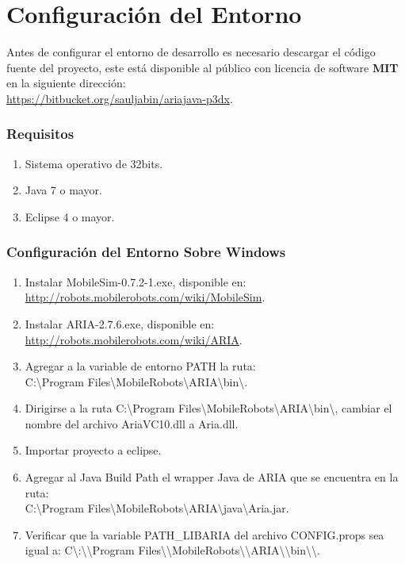 \documentclass[11pt,twoside,A5]{article}
\newcommand{\sourcecode}[2][\footnotesize]{{\ttfamily#1#2}}
\newcommand{\link}[1]{{\footnotesize\url{#1}}}
\begin{document}
\section*{Configuración del Entorno}

Antes de configurar el entorno de desarrollo es necesario descargar el código fuente del proyecto,
este está disponible al público con licencia de software \textbf{MIT} en la siguiente dirección:
\\ \link{https://bitbucket.org/sauljabin/ariajava-p3dx}.

\subsubsection*{Requisitos}
\begin{enumerate}
\item Sistema operativo de 32bits.
\item Java 7 o mayor.
\item Eclipse 4 o mayor.
\end{enumerate}

\subsubsection*{Configuración del Entorno Sobre Windows}

\begin{enumerate}
\item Instalar \sourcecode{MobileSim-0.7.2-1.exe}, disponible en: \\ \link{http://robots.mobilerobots.com/wiki/MobileSim}.
\item Instalar \sourcecode{ARIA-2.7.6.exe}, disponible en: \\ \link{http://robots.mobilerobots.com/wiki/ARIA}.
\item Agregar a la variable de entorno \sourcecode{PATH} la ruta: \\ \sourcecode{C:\textbackslash Program Files\textbackslash MobileRobots\textbackslash ARIA\textbackslash bin\textbackslash}.
\item Dirigirse a la ruta \sourcecode{C:\textbackslash Program Files\textbackslash MobileRobots\textbackslash ARIA\textbackslash bin\textbackslash}, cambiar el nombre del archivo
\sourcecode{AriaVC10.dll} a  \sourcecode{Aria.dll}.
\item Importar proyecto a eclipse.
\item Agregar al \sourcecode{Java Build Path} el wrapper Java de ARIA que se encuentra en la ruta: \\ \sourcecode{C:\textbackslash Program Files\textbackslash MobileRobots\textbackslash ARIA\textbackslash java\textbackslash Aria.jar}.
\item Verificar que la variable  \sourcecode{PATH\_LIBARIA} del archivo  \sourcecode{CONFIG.props} 
	  sea igual a:  \sourcecode{C\textbackslash:\textbackslash\textbackslash Program Files\textbackslash\textbackslash MobileRobots\textbackslash\textbackslash ARIA\textbackslash\textbackslash bin\textbackslash\textbackslash }.
\end{enumerate}
\end{document}
